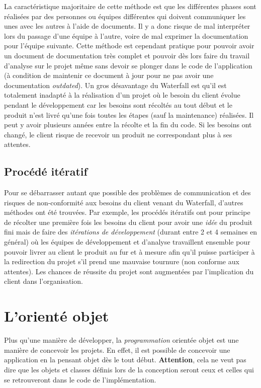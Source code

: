 \documentclass{article}
\begin{document}
		La caractéristique majoritaire de cette méthode est que les différentes phases sont réalisées par des personnes ou équipes différentes qui doivent communiquer les unes avec
		les autres à l'aide de documents. Il y a donc risque de mal interpréter lors du passage d'une équipe à l'autre, voire de mal exprimer la documentation pour l'équipe suivante.
		Cette méthode est cependant pratique pour pouvoir avoir un document de documentation très complet et pouvoir dès lors faire du travail d'analyse sur le projet même sans
		devoir se plonger dans le code de l'application (à condition de maintenir ce document à jour pour ne pas avoir une documentation \textit{outdated}). Un gros désavantage du
		Waterfall est qu'il est totalement inadapté à la réalisation d'un projet où le besoin du client évolue pendant le développement car les besoins sont récoltés au tout
		début et le produit n'est livré qu'une fois toutes les étapes (sauf la maintenance) réalisées. Il peut y avoir plusieurs années entre la récolte et la fin du code. Si les besoins
		ont changé, le client risque de recevoir un produit ne correspondant plus à ses attentes.
	
	\subsection{Procédé itératif}
		Pour se débarrasser autant que possible des problèmes de communication et des risques de non-conformité aux besoins du client venant du Waterfall, d'autres méthodes ont
		été trouvées. Par exemple, les procédés itératifs ont pour principe de récolter une première fois les besoins du client pour avoir une \textit{idée} du produit fini
		mais de faire des \textit{itérations de développement} (durant entre 2 et 4 semaines en général) où les équipes de développement et d'analyse travaillent ensemble pour
		pouvoir livrer au client le produit au fur et à mesure afin qu'il puisse participer à la redirection du projet s'il prend une mauvaise tournure (non conforme aux attentes).
		Les chances de réussite du projet sont augmentées par l'implication du client dans l'organisation.

\section{L'orienté objet}
	Plus qu'une manière de développer, la \textit{programmation} orientée objet est une manière de concevoir les projets. En effet, il est possible de concevoir une application
	en la pensant objet dès le tout début. \textbf{Attention}, cela ne veut pas dire que les objets et classes définis lors de la conception seront ceux et celles qui se retrouveront
	dans le code de l'implémentation.
\end{document}
